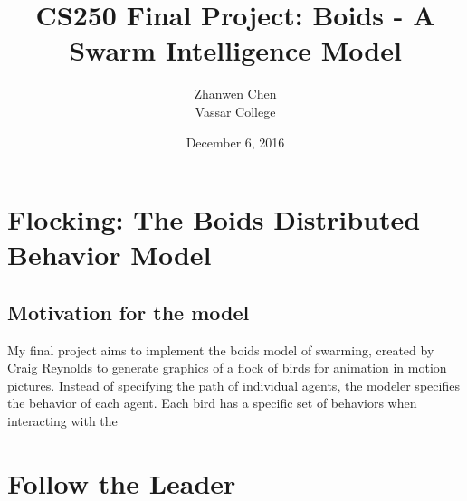 \documentclass{article}
\begin{document}
\title{CS250 Final Project: Boids - A Swarm Intelligence Model}
\date{December 6, 2016}
\author{Zhanwen Chen\\Vassar College}
\maketitle

\section{Flocking: The Boids Distributed Behavior Model}

\subsection{Motivation for the model}

My final project aims to implement the boids model of swarming, created by
Craig Reynolds to generate graphics of a flock of birds for animation
in motion pictures. Instead of specifying the path of individual agents, the
modeler specifies the behavior of each agent. Each bird has a specific set
of behaviors when interacting with the


\section{Follow the Leader}
\end{document}
